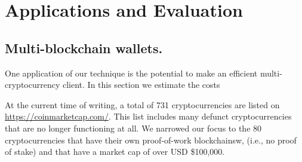 \section{Applications and Evaluation}




\subsection{Multi-blockchain wallets.}
One application of our technique is the potential to make an efficient multi-cryptocurrency client. In this section we estimate the costs



At the current time of writing, a total of 731 cryptocurrencies are listed on \url{https://coinmarketcap.com/}.
This list includes many defunct cryptocurrencies that are no longer functioning at all.
We narrowed our focus to the 80 cryptocurrencies that have their own proof-of-work blockchainsw, (i.e., no proof of stake) and that have a market cap of over USD \$100,000.

